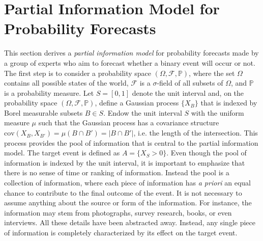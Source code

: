 \documentclass[11pt]{article}
\renewcommand{\P}{\mathbb{P}}
\theoremstyle{definition}
\theoremstyle{definition}
\begin{document}
\section{Partial Information Model for Probability Forecasts}
\label{Model}
This section derives a \textit{partial information model} for probability forecasts made by a group of experts who aim to forecast whether a binary event will occur or not. The first step is to consider a probability space  $(\Omega, \mathcal{F}, \P)$, where the set $\Omega$ contains all possible states of the world,  $\mathcal{F}$ is a $\sigma$-field of all subsets of $\Omega$, and $\P$ is a probability measure. Let $S = [0,1]$ denote the unit interval and, on the probability space $(\Omega, \mathcal{F}, \P)$, define a Gaussian process $\{ X_B \}$ that is indexed by Borel measurable subsets $B \in S$. Endow the unit interval $S$ with the uniform measure $\mu$ such that the Gaussian process has a covariance structure $\text{cov}(X_B, X_{B'}) = \mu(B \cap B') = |B \cap B'|$, i.e. the length of the intersection. This process provides the pool of information that is central to the partial information model. The target event is defined as $A = \{ X_{S} > 0\}$. Even though the pool of information is indexed by the unit interval, it is important to emphasize that there is no sense of time or ranking of information. Instead the pool is a collection of information, where each piece of information has \textit{a priori} an equal chance to contribute to the final outcome of the event. It is not necessary to assume anything about the source or form of the information. For instance, the information may stem from photographs, survey research, books, or even interviews. All these details have been abstracted away. Instead, any single piece of information is completely characterized by its effect on the target event. 
\end{document}
